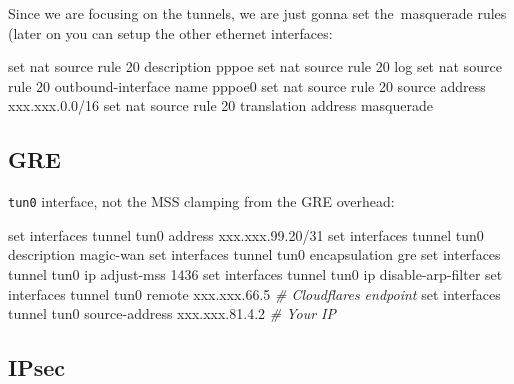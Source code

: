 \documentclass[
]{article}
\newenvironment{Shaded}{\begin{snugshade}}{\end{snugshade}}
\newcommand{\BuiltInTok}[1]{#1}
\newcommand{\CommentTok}[1]{\textcolor[rgb]{0.56,0.35,0.01}{\textit{#1}}}
\newcommand{\NormalTok}[1]{#1}
\newcommand{\StringTok}[1]{\textcolor[rgb]{0.31,0.60,0.02}{#1}}
\begin{document}
Since we are focusing on the tunnels, we are just gonna set
the~masquerade rules (later on you can setup the other ethernet
interfaces:

\begin{Shaded}
\begin{Highlighting}[numbers=left,,]
\BuiltInTok{set}\NormalTok{ nat source rule 20 description }\StringTok{\textquotesingle{}pppoe\textquotesingle{}}
\BuiltInTok{set}\NormalTok{ nat source rule 20 log}
\BuiltInTok{set}\NormalTok{ nat source rule 20 outbound{-}interface name }\StringTok{\textquotesingle{}pppoe0\textquotesingle{}}
\BuiltInTok{set}\NormalTok{ nat source rule 20 source address }\StringTok{\textquotesingle{}xxx.xxx.0.0/16\textquotesingle{}}
\BuiltInTok{set}\NormalTok{ nat source rule 20 translation address }\StringTok{\textquotesingle{}masquerade\textquotesingle{}}
\end{Highlighting}
\end{Shaded}

\subsection{GRE}\label{gre}

\texttt{tun0} interface, not the MSS clamping from the GRE overhead:

\begin{Shaded}
\begin{Highlighting}[numbers=left,,]
\BuiltInTok{set}\NormalTok{ interfaces tunnel tun0 address }\StringTok{\textquotesingle{}xxx.xxx.99.20/31\textquotesingle{}}
\BuiltInTok{set}\NormalTok{ interfaces tunnel tun0 description }\StringTok{\textquotesingle{}magic{-}wan\textquotesingle{}}
\BuiltInTok{set}\NormalTok{ interfaces tunnel tun0 encapsulation }\StringTok{\textquotesingle{}gre\textquotesingle{}}
\BuiltInTok{set}\NormalTok{ interfaces tunnel tun0 ip adjust{-}mss }\StringTok{\textquotesingle{}1436\textquotesingle{}}
\BuiltInTok{set}\NormalTok{ interfaces tunnel tun0 ip disable{-}arp{-}filter}
\BuiltInTok{set}\NormalTok{ interfaces tunnel tun0 remote }\StringTok{\textquotesingle{}xxx.xxx.66.5\textquotesingle{}} \CommentTok{\# Cloudflare\textquotesingle{}s endpoint}
\BuiltInTok{set}\NormalTok{ interfaces tunnel tun0 source{-}address }\StringTok{\textquotesingle{}xxx.xxx.81.4.2\textquotesingle{}} \CommentTok{\# Your IP}
\end{Highlighting}
\end{Shaded}

\subsection{IPsec}\label{ipsec}
\end{document}

